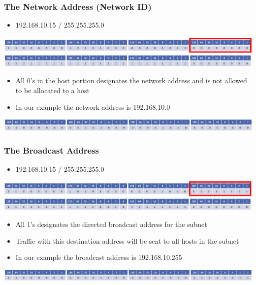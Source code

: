 \documentclass[pdflatex,compress]{beamer}
\begin{document}
\begin{frame}
	\frametitle{The Network Address (Network ID)}
	\begin{itemize}
		\item 192.168.10.15 / 255.255.255.0
	\end{itemize}
	\begin{center}
		\includegraphics[width=\linewidth]{img/img29}
	\end{center}
	\begin{itemize}
		\item All 0's in the host portion designates the network address and is not allowed to be allocated to a host
		\item In our example the network address is 192.168.10.0
	\end{itemize}
	\begin{center}
		\includegraphics[width=\linewidth]{img/img30}
	\end{center}
\end{frame}

\begin{frame}
	\frametitle{The Broadcast Address}
	\begin{itemize}
		\item 192.168.10.15 / 255.255.255.0
	\end{itemize}
	\begin{center}
		\includegraphics[width=\linewidth]{img/img31}
	\end{center}
	\begin{itemize}
		\item All 1's designates the directed broadcast address for the subnet
		\item Traffic with this destination address will be sent to all hosts in the subnet
		\item In our example the broadcast address is 192.168.10.255
	\end{itemize}
	\begin{center}
		\includegraphics[width=\linewidth]{img/img32}
	\end{center}
\end{frame}
\end{document}
